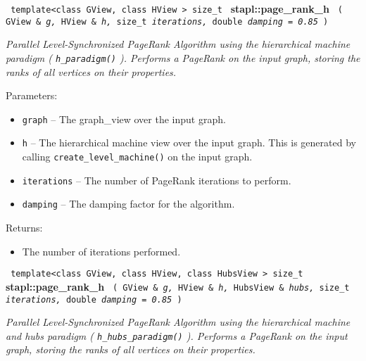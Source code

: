 \noindent
\texttt{%
template<class GView, class HView >
\newline
size\_t 
}
\newline
\textbf{stapl::page\_rank\_h}%
\newline
\texttt{%
(
GView \&
\textit{g,}%
HView \&
\textit{h,}%
size\_t
\textit{iterations,}%
double
\textit{damping = 0.85}%
)     
}
\vspace{0.4cm}

\textit{
Parallel Level-Synchronized PageRank Algorithm using the hierarchical machine paradigm (
\texttt{h\_paradigm()}%
).
Performs a PageRank on the input graph, storing the ranks of all vertices on their properties.
}
\vspace{0.4cm}

Parameters:
\begin{itemize}
\item
\texttt{graph} --
The graph\_view over the input graph.
\item
\texttt{h} --
The hierarchical machine view over the input graph. This is generated by calling
\texttt{create\_level\_machine()} 
on the input graph.
\item
\texttt{iterations} --
The number of PageRank iterations to perform.
\item
\texttt{damping} --
The damping factor for the algorithm.
\end{itemize}

Returns:
\begin{itemize}
\item
The number of iterations performed. 
\end{itemize}


\noindent
\texttt{%
template<class GView, class HView, class HubsView >
\newline
size\_t 
}
\textbf{stapl::page\_rank\_h}%
\newline
\texttt{%
(
GView \&
\textit{g,}%
HView \&
\textit{h,}%
HubsView \&
\textit{hubs,}%
size\_t
\textit{iterations,}%
double
\textit{damping = 0.85}%
)     
}
\vspace{0.4cm}

\textit{
Parallel Level-Synchronized PageRank Algorithm using the hierarchical machine and hubs paradigm (
\texttt{h\_hubs\_paradigm()}%
).
Performs a PageRank on the input graph, storing the ranks of all vertices on their properties.
}
\vspace{0.4cm}

